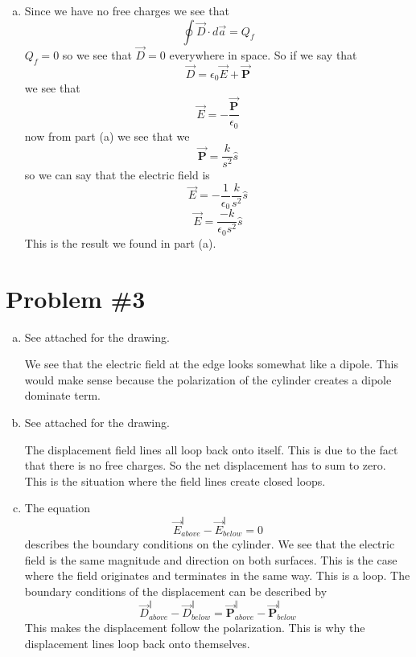 \documentclass[11pt]{article}
\numberwithin{equation}{section}
\newcommand{\vecE}{\vec{E}}
\newcommand{\vecP}{\vec{\mathbf{P}}}
\begin{document}
\begin{enumerate}[(a)]
\item
Since we have no free charges we see that
$$\oint\vec{D}\cdot d\vec{a} = Q_f$$
$Q_f =0$ so we see that $\vec{D} = 0$ everywhere in space. So if we say that
$$\vec{D} = \epsilon_0 \vecE + \vecP$$
we see that 
$$\vecE = -\frac{\vecP}{\epsilon_0}$$
now from part (a) we see that we 
$$\vecP = \frac{k}{s^2}\hat{s}$$
so we can say that the electric field is
$$\vecE = -\frac{1}{\epsilon_0}\frac{k}{s^2}\hat{s}$$
$$\vecE = \frac{-k}{\epsilon_0s^2}\hat{s}$$
This is the result we found in part (a).
\end{enumerate}

\section{Problem \#3}
\begin{enumerate}[(a)]
\item
See attached for the drawing. 

We see that the electric field at the edge looks somewhat like a dipole. This would make sense because the polarization of the cylinder creates a dipole dominate term. 

\item
See attached for the drawing. 

The displacement field lines all loop back onto itself. This is due to the fact that there is no free charges. So the net displacement has to sum to zero. This is the situation where the field lines create closed loops.
\item
The equation
$$\vecE^{\Vert}_{above} - \vecE^{\Vert}_{below} = 0$$
describes the boundary conditions on the cylinder. We see that the electric field is the same magnitude and direction on both surfaces. This is the case where the field originates and terminates in the same way. This is a loop. The boundary conditions of the displacement can be described by
$$\vec{D}^{\Vert}_{above} - \vec{D}^{\Vert}_{below} = \vecP^{\Vert}_{above}-\vecP^{\Vert}_{below}$$
This makes the displacement follow the polarization. This is why the displacement lines loop back onto themselves.
\end{enumerate}
\end{document}
